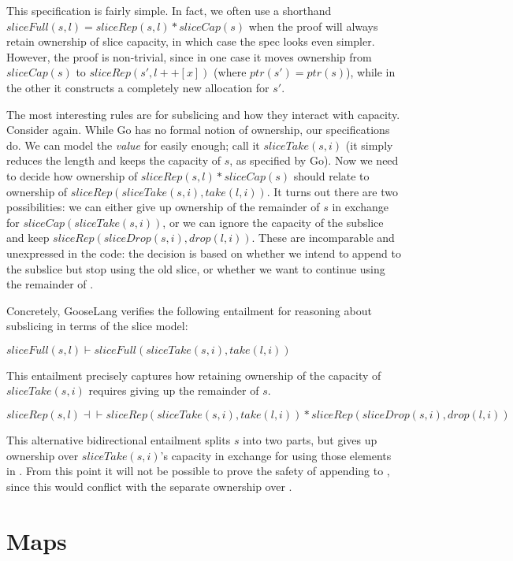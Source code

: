 This specification is fairly simple. In fact, we often use a shorthand
$sliceFull(s, l) = sliceRep(s, l) * sliceCap(s)$ when the proof will
always retain ownership of slice capacity, in which case the spec looks
even simpler. However, the proof is non-trivial, since in one case it
moves ownership from $sliceCap(s)$ to $sliceRep(s', l ++ [x])$
(where $ptr(s') = ptr(s)$), while in the other it constructs a
completely new allocation for $s'$.

The most interesting rules are for subslicing and how they interact with
capacity. Consider  again. While Go has no formal
notion of ownership, our specifications do. We can model the
\emph{value} for  easily enough; call it
$sliceTake(s, i)$ (it simply reduces the length and keeps the capacity
of $s$, as specified by Go). Now we need to decide how ownership of
$sliceRep(s, l) * sliceCap(s)$ should relate to ownership of
$sliceRep(sliceTake(s, i), take(l, i))$. It turns out there are two
possibilities: we can either give up ownership of the remainder of $s$
in exchange for $sliceCap(sliceTake(s, i))$, or we can ignore the
capacity of the subslice and keep
$sliceRep(sliceDrop(s, i), drop(l, i))$. These are incomparable and
unexpressed in the code: the decision is based on whether we intend to
append to the subslice but stop using the old slice, or whether we want
to continue using the remainder of .

Concretely, GooseLang verifies the following entailment for reasoning
about subslicing in terms of the slice model:

$sliceFull(s, l) \vdash sliceFull(sliceTake(s, i), take(l, i))$

This entailment precisely captures how retaining ownership of the
capacity of $sliceTake(s, i)$ requires giving up the remainder of
$s$.

$sliceRep(s, l) \dashv\vdash sliceRep(sliceTake(s, i), take(l, i)) * sliceRep(sliceDrop(s, i), drop(l, i))$

This alternative bidirectional entailment splits $s$ into two parts,
but gives up ownership over $sliceTake(s, i)$'s capacity in exchange
for using those elements in . From this point it will
not be possible to prove the safety of appending to ,
since this would conflict with the separate ownership over
.

\section{Maps}

